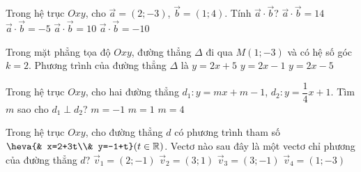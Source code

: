 \begin{ex}%
	Trong hệ trục $Oxy$, cho $\vec{a}=(2;-3)$, $\vec{b}=(1;4)$. Tính $\vec{a}\cdot\vec{b}$?
	\choice
	{$\vec{a}\cdot\vec{b}=14$}
	{$\vec{a}\cdot\vec{b}=-5$}
	{$\vec{a}\cdot\vec{b}=10$}
	{\True $\vec{a}\cdot\vec{b}=-10$}
\end{ex}
\begin{ex}%
	Trong mặt phẳng tọa độ $Oxy$, đường thẳng $\Delta$ đi qua $M(1;-3)$ và có hệ số góc $k=2$. Phương trình của đường thẳng $\Delta$ là
	{$y=2x+5$}
	{$y=2x-1$}
	{\True $y=2x-5$}
\end{ex}

\begin{ex}%
	Trong hệ trục $Oxy$, cho hai đường thẳng $d_1\colon y=mx+m-1$, $d_2\colon y=\dfrac{1}{4}x+1$. Tìm $m$ sao cho $d_1 \perp d_2$?
	{$m=-1$}
	{$m=1$}
	{$m=4$}
\end{ex}

\begin{ex}%
	Trong hệ trục $Oxy$, cho đường thẳng $d$ có phương trình tham số $\heva{& x=2+3t\\& y=-1+t} (t \in \mathbb{R})$. Vectơ nào sau đây là một vectơ chỉ phương của đường thẳng $d$?
	\choice
	{$\Vec{v}_1=(2;-1)$}
	{\True $\Vec{v}_2=(3;1)$}
	{$\Vec{v}_3=(3;-1)$}
	{$\Vec{v}_4=(1;-3)$}
\end{ex}

